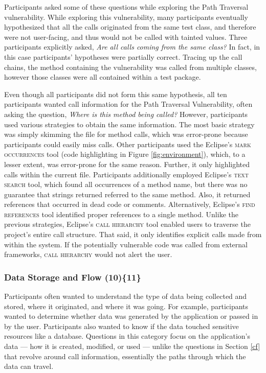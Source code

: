 \documentclass{acm_proc_article-sp}
\begin{document}
Participants asked some of these questions while exploring the Path Traversal vulnerability.
While exploring this vulnerability, many participants eventually hypothesized that all the calls originated from the same test class, and therefore were not user-facing, and thus would not be called with tainted values.
Three participants explicitly asked, \textit{Are all calls coming from the same class?} 
In fact, in this case participants' hypotheses were partially correct. 
Tracing up the call chains, the method containing the vulnerability was called from multiple classes, however those classes were all contained within a test package.

Even though all participants did not form this same hypothesis, all ten participants wanted call information for the Path Traversal Vulnerability, often asking the question, \textit{Where is this method being called?} 
However, participants used various strategies to obtain the same information.
The most basic strategy was simply skimming the file for method calls, which was error-prone because participants could easily miss calls.
Other participants used the Eclipse's \textsc{mark occurrences} tool (code highlighting in Figure \ref{fig:environment}), which, to a lesser extent, was error-prone for the same reason. 
Further, it only highlighted calls within the current file.
Participants additionally employed Eclipse's \textsc{text search} tool, which found all occurrences of a method name, but there was no guarantee that strings returned referred to the same method.
Also, it returned references that occurred in dead code or comments.
Alternatively, Eclipse's \textsc{find references} tool identified proper references to a single method.
Unlike the previous strategies, Eclipse's \textsc{call hierarchy} tool enabled users to traverse the project's entire call structure.
That said, it only identifies explicit calls made from within the system. 
If the potentially vulnerable code was called from external frameworks, \textsc{call hierarchy} would not alert the user.
 


\subsubsection{\textbf{Data Storage and Flow (10)\{11\}}}\label{dsf}
Participants often wanted to understand the type of data being collected and stored, where it originated, and where it was going. 
For example, participants wanted to determine whether data was generated by the application or passed in by the user. 
Participants also wanted to know if the data touched sensitive resources like a database.
Questions in this category focus on the application's data --- how it is created, modified, or used --- unlike the questions in Section \ref{cf} that revolve around call information, essentially the paths through which the data can travel.
\end{document}
